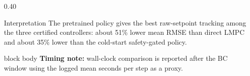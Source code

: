 \documentclass[aspectratio=169]{beamer}
\begin{document}
\begin{frame}
\begin{columns}[T,onlytextwidth]
\begin{column}{0.40\textwidth}
\vspace{0.05cm}
\begin{block}{Interpretation}
\justifying
The pretrained policy gives the best raw-setpoint tracking among the three certified controllers: about 51\% lower mean RMSE than direct LMPC and about 35\% lower than the cold-start safety-gated policy.
\end{block}

\vspace{0.05cm}
\begin{beamercolorbox}[rounded=true,sep=4pt,wd=\linewidth]{block body}
\textbf{Timing note:} wall-clock comparison is reported after the BC window using the logged mean seconds per step as a proxy.
\end{beamercolorbox}
\end{column}
\end{columns}

\end{frame}
\end{document}
